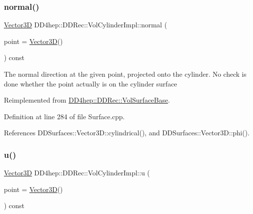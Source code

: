 \hypertarget{class_d_d4hep_1_1_d_d_rec_1_1_vol_cylinder_impl_a96815a3a2f7f759ffe5028384308a1aa}{}\label{class_d_d4hep_1_1_d_d_rec_1_1_vol_cylinder_impl_a96815a3a2f7f759ffe5028384308a1aa} 
\subsubsection{\texorpdfstring{normal()}{normal()}}
{\footnotesize\ttfamily \hyperlink{class_d_d_surfaces_1_1_vector3_d}{Vector3D} D\+D4hep\+::\+D\+D\+Rec\+::\+Vol\+Cylinder\+Impl\+::normal (\begin{DoxyParamCaption}\item[{const \hyperlink{class_d_d_surfaces_1_1_vector3_d}{Vector3D} \&}]{point = {\ttfamily \hyperlink{class_d_d_surfaces_1_1_vector3_d}{Vector3D}()} }\end{DoxyParamCaption}) const\hspace{0.3cm}{\ttfamily [virtual]}}

The normal direction at the given point, projected onto the cylinder. No check is done whether the point actually is on the cylinder surface 

Reimplemented from \hyperlink{class_d_d4hep_1_1_d_d_rec_1_1_vol_surface_base_a247a1503e7265c3a9e4a6a17df2c58e4}{D\+D4hep\+::\+D\+D\+Rec\+::\+Vol\+Surface\+Base}.



Definition at line 284 of file Surface.\+cpp.



References D\+D\+Surfaces\+::\+Vector3\+D\+::cylindrical(), and D\+D\+Surfaces\+::\+Vector3\+D\+::phi().

\hypertarget{class_d_d4hep_1_1_d_d_rec_1_1_vol_cylinder_impl_a6dd06a67301fc423f1785c814f73d906}{}\label{class_d_d4hep_1_1_d_d_rec_1_1_vol_cylinder_impl_a6dd06a67301fc423f1785c814f73d906} 
\subsubsection{\texorpdfstring{u()}{u()}}
{\footnotesize\ttfamily \hyperlink{class_d_d_surfaces_1_1_vector3_d}{Vector3D} D\+D4hep\+::\+D\+D\+Rec\+::\+Vol\+Cylinder\+Impl\+::u (\begin{DoxyParamCaption}\item[{const \hyperlink{class_d_d_surfaces_1_1_vector3_d}{Vector3D} \&}]{point = {\ttfamily \hyperlink{class_d_d_surfaces_1_1_vector3_d}{Vector3D}()} }\end{DoxyParamCaption}) const\hspace{0.3cm}{\ttfamily [virtual]}}

